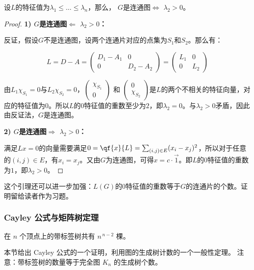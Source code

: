 \documentclass[lang=cn,newtx,10pt,scheme=chinese,chinesefont=nofont,citestyle=gb7714-2015, bibstyle=gb7714-2015]{elegantbook}
\begin{document}
\begin{refsection}
\begin{lemma}
\label{lem:lambda_connectivity}
    设$L$的特征值为$\lambda_1\leq\dots\leq\lambda_n$，那么，
    $G$是连通图$\Leftrightarrow$ $\lambda_2>0$。
\end{lemma}
\begin{proof}
\textbf{1) $G$是连通图$\Leftarrow$ $\lambda_2>0$：}

反证，假设$G$不是连通图，设两个连通片对应的点集为$S_1$和$S_2$。那么有：

\[L=D-A=\left(\begin{array}{cc}
    D_1-A_1 & 0 \\
    0 & D_2-A_2
\end{array}\right)=\left(\begin{array}{cc}
    L_1 & 0 \\
    0 & L_2
\end{array}\right)\]

由$L_1\chi_{S_1}=0$与$L_2\chi_{S_2}=0$，$\left(\begin{array}{cc}
     \chi_{S_1}\\
     0 
\end{array}\right)$ 和 $\left(\begin{array}{cc}
     0\\
     \chi_{S_2}
\end{array}\right)$是$L$的两个不相关的特征向量，对应的特征值为$0$。所以$L$的$0$特征值的重数至少为$2$，即$\lambda_2=0$。与$\lambda_2>0$矛盾，因此由反证法，$G$是连通图。

\textbf{2) $G$是连通图$\Rightarrow$ $\lambda_2>0$：}

满足$Lx=0$的向量需要满足$0=\qf{x}{L}=\sum_{(i,j)\in E}(x_i-x_j)^2$，所以对于任意的$(i,j)\in E$，有$x_i=x_j$。又由$G$为连通图，可得$x=c\cdot\overrightarrow{1}$。即$L$的$0$特征值的重数为$1$，即$\lambda_2>0$。
\end{proof}
这个引理还可以进一步加强：$L(G)$的$0$特征值的重数等于$G$的连通片的个数。证明留给读者作为习题。

\subsubsection{Cayley 公式与矩阵树定理}

\begin{theorem}[Cayley 公式]\label{thm:cayley}
在 $n$ 个顶点上的带标签树共有 $n^{\,n-2}$ 棵。
\end{theorem}

本节给出 Cayley 公式的一个证明，利用图的生成树计数的一个一般性定理。
注意：带标签树的数量等于完全图 $K_n$ 的生成树个数。


\end{refsection}
\end{document}
